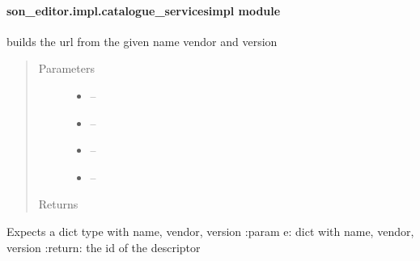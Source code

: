 \documentclass[letterpaper,10pt,english]{sphinxmanual}
\begin{document}
\paragraph{son\_editor.impl.catalogue\_servicesimpl module}
\label{_source/son_editor.impl:son-editor-impl-catalogue-servicesimpl-module}\label{_source/son_editor.impl:module-son_editor.impl.catalogue_servicesimpl}

\begin{fulllineitems}
\label{_source/son_editor.impl:son_editor.impl.catalogue_servicesimpl.build_URL}
builds the url from the given name vendor and version
\begin{quote}\begin{description}
\item[{Parameters}] \leavevmode\begin{itemize}
\item {} 
 -- 

\item {} 
 -- 

\item {} 
 -- 

\item {} 
 -- 

\end{itemize}

\item[{Returns}] \leavevmode


\end{description}\end{quote}

\end{fulllineitems}


\begin{fulllineitems}
\label{_source/son_editor.impl:son_editor.impl.catalogue_servicesimpl.create_id}
Expects a dict type with name, vendor, version
:param e: dict with name, vendor, version
:return: the id of the descriptor

\end{fulllineitems}
\end{document}
